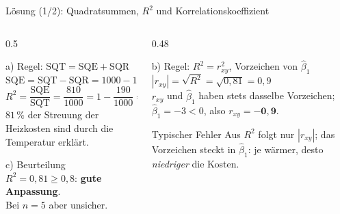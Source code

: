 \documentclass[aspectratio=169,11pt]{beamer}
\begin{document}
\begin{frame}{Lösung (1/2): Quadratsummen, $R^{2}$ und Korrelationskoeffizient}
  \begin{columns}[T]
    \begin{column}{0.5\textwidth}
      \small
      \begin{block}{a) Regel: $\text{SQT} = \text{SQE} + \text{SQR}$}
        $\text{SQE} = \text{SQT} - \text{SQR} = 1000 - 190 = \mathbf{810}$\\[3pt]
        $R^{2} = \dfrac{\text{SQE}}{\text{SQT}} = \dfrac{810}{1000} = 1 - \dfrac{190}{1000} = \mathbf{0{,}81}$\\[3pt]
        $81\,\%$ der Streuung der Heizkosten sind durch die Temperatur erklärt.
      \end{block}
      \begin{exampleblock}{c) Beurteilung}
        $R^{2} = 0{,}81 \ge 0{,}8$: \textbf{gute Anpassung}.\\ Bei $n = 5$ aber unsicher.
      \end{exampleblock}
    \end{column}
    \begin{column}{0.48\textwidth}
      \small
      \begin{block}{b) Regel: $R^{2} = r_{xy}^{2}$, Vorzeichen von $\hat{\beta}_1$}
        $|r_{xy}| = \sqrt{R^{2}} = \sqrt{0{,}81} = 0{,}9$\\[3pt]
        $r_{xy}$ und $\hat{\beta}_1$ haben stets dasselbe Vorzeichen;
        $\hat{\beta}_1 = -3 < 0$, also $r_{xy} = \mathbf{-0{,}9}$.
      \end{block}
      \begin{alertblock}{Typischer Fehler}
        Aus $R^{2}$ folgt nur $|r_{xy}|$; das Vorzeichen steckt in $\hat{\beta}_1$:
        je wärmer, desto \emph{niedriger} die Kosten.
      \end{alertblock}
    \end{column}
  \end{columns}
\end{frame}
\end{document}
